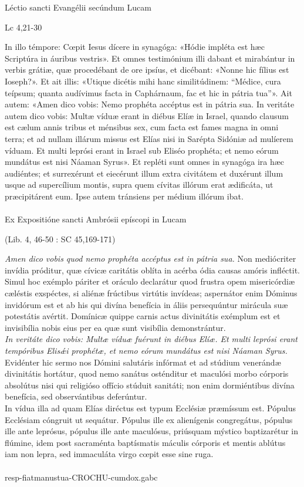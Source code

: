 \documentclass[options]{article}
\begin{document}
	Léctio sancti Evangélii secúndum Lucam 
	\begin{flushright}
		Lc 4,21-30
	\end{flushright}
	In illo témpore:
	Cœpit Iesus dícere in synagóga: «Hódie impléta est hæc Scriptúra in áuribus vestris».
	Et omnes testimónium illi dabant et mirabántur in verbis grátiæ, quæ procedébant de ore ipsíus, et dicébant: «Nonne hic fílius est Ioseph?».
	Et ait illis: «Utique dicétis mihi hanc similitúdinem: “Médice, cura teípsum; quanta audívimus facta in Caphárnaum, fac et hic in pátria tua”».
	Ait autem: «Amen dico vobis: Nemo prophéta accéptus est in pátria sua. In veritáte autem dico vobis: Multæ víduæ erant in diébus Elíæ in Israel, quando clausum est cælum annis tribus et ménsibus sex, cum facta est fames magna in omni terra; et ad nullam illárum missus est Elías nisi in Sarépta Sidóniæ ad mulíerem víduam. Et multi leprósi erant in Israel sub Eliséo prophéta; et nemo eórum mundátus est nisi Náaman Syrus».
	Et repléti sunt omnes in synagóga ira hæc audiéntes; et surrexérunt et eiecérunt illum extra civitátem et duxérunt illum usque ad supercílium montis, supra quem cívitas illórum erat ædificáta, ut præcipitárent eum. Ipse autem tránsiens per médium illórum ibat.\\
	\\
	Ex Expositióne sancti Ambrósii epíscopi in Lucam 
	\begin{flushright}
		(Lib. 4, 46-50 : SC 45,169-171)
	\end{flushright}
	\emph{Amen dico vobis quod nemo prophéta accéptus est in pátria sua.} Non mediócriter invídia próditur, quæ cívicæ caritátis oblíta in acérba ódia causas amóris infléctit. Simul hoc exémplo páriter et oráculo declarátur quod frustra opem misericórdiæ cæléstis exspéctes, si aliénæ frúctibus virtútis invídeas; aspernátor enim Dóminus invidórum est et ab his qui divína benefícia in áliis persequúntur mirácula suæ potestátis avértit. Domínicæ quippe carnis actus divinitátis exémplum est et invisibília nobis eius per ea quæ sunt visibília demonstrántur.\\

	\emph{In veritáte dico vobis: Multæ víduæ fuérunt in diébus Elíæ. Et multi leprósi erant tempóribus Elis\'{æ}i prophétæ, et nemo eórum mundátus est nisi Náaman Syrus.} Evidénter hic sermo nos Dómini salutáris infórmat et ad stúdium venerándæ divinitátis hortátur, quod nemo sanátus osténditur et maculósi morbo córporis absolútus nisi qui religióso offício stúduit sanitáti; non enim dormiéntibus divína benefícia, sed observántibus deferúntur.\\
	
	In vídua illa ad quam Elías diréctus est typum Ecclésiæ præmíssum est. Pópulus Ecclésiam cóngruit ut sequátur. Pópulus ille ex alienígenis congregátus, pópulus ille ante leprósus, pópulus ille ante maculósus, priúsquam mýstico baptizarétur in flúmine, idem post sacraménta baptísmatis máculis córporis et mentis ablútus iam non lepra, sed immaculáta virgo cœpit esse sine ruga.\\
	\\
	resp-fiatmanustua-CROCHU-cumdox.gabc
\end{document}
